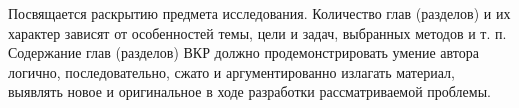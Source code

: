 Посвящается раскрытию предмета исследования. Количество глав (разделов) и их характер зависят от особенностей темы, цели и задач, выбранных методов и т. п. Содержание глав (разделов) ВКР должно продемонстрировать умение автора логично, последовательно, сжато и аргументированно излагать материал, выявлять новое и оригинальное в ходе разработки рассматриваемой проблемы.
